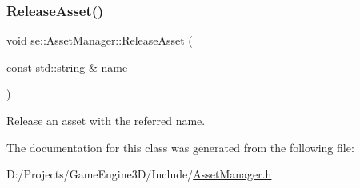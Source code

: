 \subsubsection{\texorpdfstring{Release\+Asset()}{ReleaseAsset()}}
{\footnotesize\ttfamily void se\+::\+Asset\+Manager\+::\+Release\+Asset (\begin{DoxyParamCaption}\item[{const std\+::string \&}]{name }\end{DoxyParamCaption})}

Release an asset with the referred name. 

The documentation for this class was generated from the following file\+:\begin{DoxyCompactItemize}
\item 
D\+:/\+Projects/\+Game\+Engine3\+D/\+Include/\mbox{\hyperlink{_asset_manager_8h}{Asset\+Manager.\+h}}\end{DoxyCompactItemize}
